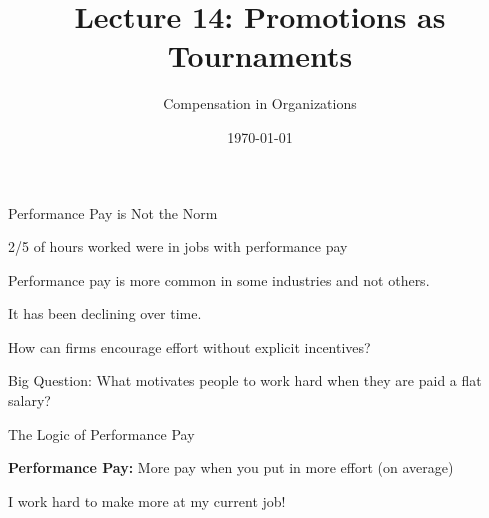 \documentclass[aspectratio=169,usenames,dvipsnames]{beamer}
\title[diss]{Lecture 14: Promotions as Tournaments} %
\author{Compensation in Organizations} %
\institute[shortinst]{Jacob Kohlhepp}
\date{\today} %
\newenvironment{wideitemize}{\itemize\addtolength{\itemsep}{10pt}}{\enditemize}
\begin{document}
\begin{frame}
\titlepage %

\end{frame}


\begin{frame}{Performance Pay is Not the Norm}

\begin{wideitemize}
    \item 2/5 of hours worked were in jobs with performance pay 
    \item Performance pay is more common in some industries and not others.
    \item It has been declining over time.
    \item How can firms encourage effort without explicit incentives?
\end{wideitemize}
    
\end{frame}


\begin{frame}
\centering
    \huge Big Question:  What motivates people to work hard when they are paid a flat salary?
\end{frame}

\begin{frame}{The Logic of Performance Pay}
\begin{wideitemize}
    \item \textbf{Performance Pay:} More pay when you put in more effort (on average)
    \begin{wideitemize}
        \item I work hard to make more at my current job!
    \end{wideitemize}
\end{wideitemize}

\end{frame}
\end{document}
